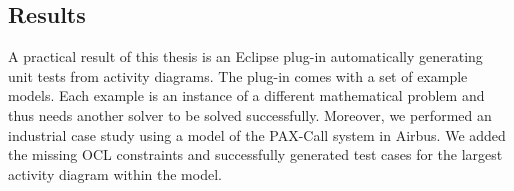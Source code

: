 \subsection{Results}
A practical result of this thesis is an Eclipse plug-in automatically generating unit tests from activity diagrams. The plug-in comes with a set of example models. Each example is an instance of a different mathematical problem and thus needs another solver to be solved successfully. Moreover, we performed an industrial case study using a model of the PAX-Call system in Airbus. We added the missing OCL constraints and successfully generated test cases for the largest activity diagram within the model.



